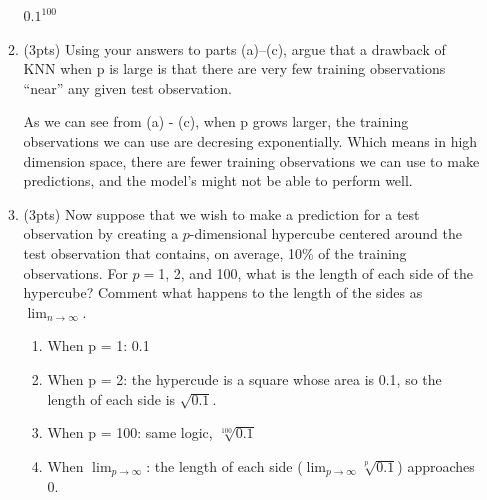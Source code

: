 \documentclass[a4paper]{article}
\theoremstyle{definition}
\newenvironment{soln}{
    \leavevmode\color{blue}\ignorespaces
}{}
\begin{document}
\begin{enumerate}
\begin{enumerate}
		            \begin{soln}
			            $0.1^{100}$
		            \end{soln}

		      \item (3pts) Using your answers to parts (a)–(c), argue that a drawback of KNN when p is large is that there are very few training observations “near” any given test observation.

		            \begin{soln}
			            As we can see from (a) - (c), when p grows larger, the training observations we can use are decresing exponentially. Which means in high dimension space, there are fewer training observations we can use to make predictions, and the model's might not be able to perform well.
		            \end{soln}

		      \item (3pts) Now suppose that we wish to make a prediction for a test observation by creating a $p$-dimensional hypercube centered around the test observation that contains, on average, 10\% of the training observations. For $p =$1, 2, and 100, what is the length of each side of the hypercube? Comment what happens to the length of the sides as $\lim_{{n \to \infty}}$.

		            \begin{soln}
			            \begin{enumerate}
				            \item When p = 1: 0.1
				            \item When p = 2: the hypercude is a square whose area is 0.1, so the length of each side is $\sqrt{0.1}$.
				            \item When p = 100: same logic, $\sqrt[100]{0.1}$
				            \item When $\lim_{p \to \infty}$: the length of each side ($\lim_{p \to \infty} \sqrt[p]{0.1}$) approaches 0.
			            \end{enumerate}
		            \end{soln}

	      \end{enumerate}


\end{enumerate}
\end{document}
